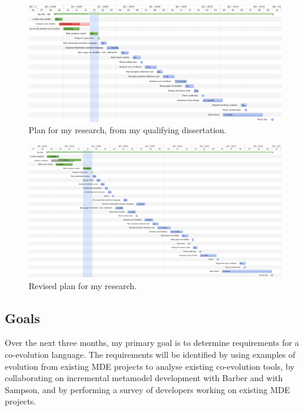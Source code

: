 \begin{landscape}

\begin{figure}[ht]
  \begin{center}
    \leavevmode
    \includegraphics[scale=0.5]{old_plan.png}
  \end{center}
  \caption{Plan for my research, from my qualifying dissertation.}
  \label{fig:old_plan}
\end{figure}

\begin{figure}[ht]
  \begin{center}
    \leavevmode
    \includegraphics[scale=0.42]{revised_plan.png}
  \end{center}
  \caption{Revised plan for my research.}
  \label{fig:revised_plan}
\end{figure}

\end{landscape}


\subsection{Goals} %
\label{sub:goals}
Over the next three months, my primary goal is to determine requirements for a co-evolution language. The requirements will be identified by using examples of evolution from existing MDE projects to analyse existing co-evolution tools, by collaborating on incremental metamodel development with Barber and with Sampson, and by performing a survey of developers working on existing MDE projects.

